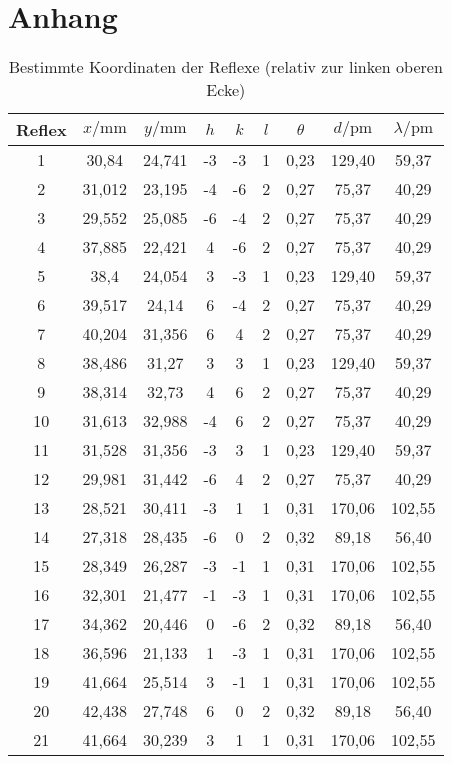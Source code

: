 \section{Anhang}
\begin{table}[h]
\centering
\caption{Bestimmte Koordinaten der Reflexe (relativ zur linken oberen Ecke)}
\label{tab:coords}
\begin{tabular}{ccccccccc}
\toprule
Reflex & $x/\si{\milli\meter}$ & $y/\si{\milli\meter}$ & $h$ & $k$ & $l$ & $\theta$ & $d/\si{\pico\meter}$ & $\lambda/\si{\pico\meter}$\\
\midrule
1 & 30,84 & 24,741 & -3 & -3 & 1 & 0,23 & 129,40 & 59,37\\
2 & 31,012 & 23,195 & -4 & -6 & 2 & 0,27 & 75,37 & 40,29\\
3 & 29,552 & 25,085 & -6 & -4 & 2 & 0,27 & 75,37 & 40,29\\
4 & 37,885 & 22,421 & 4 & -6 & 2 & 0,27 & 75,37 & 40,29\\
5 & 38,4 & 24,054 & 3 & -3 & 1 & 0,23 & 129,40 & 59,37\\
6 & 39,517 & 24,14 & 6 & -4 & 2 & 0,27 & 75,37 & 40,29\\
7 & 40,204 & 31,356 & 6 & 4 & 2 & 0,27 & 75,37 & 40,29\\
8 & 38,486 & 31,27 & 3 & 3 & 1 & 0,23 & 129,40 & 59,37\\
9 & 38,314 & 32,73 & 4 & 6 & 2 & 0,27 & 75,37 & 40,29\\
10 & 31,613 & 32,988 & -4 & 6 & 2 & 0,27 & 75,37 & 40,29\\
11 & 31,528 & 31,356 & -3 & 3 & 1 & 0,23 & 129,40 & 59,37\\
12 & 29,981 & 31,442 & -6 & 4 & 2 & 0,27 & 75,37 & 40,29\\
13 & 28,521 & 30,411 & -3 & 1 & 1 & 0,31 & 170,06 & 102,55\\
14 & 27,318 & 28,435 & -6 & 0 & 2 & 0,32 & 89,18 & 56,40\\
15 & 28,349 & 26,287 & -3 & -1 & 1 & 0,31 & 170,06 & 102,55\\
16 & 32,301 & 21,477 & -1 & -3 & 1 & 0,31 & 170,06 & 102,55\\
17 & 34,362 & 20,446 & 0 & -6 & 2 & 0,32 & 89,18 & 56,40\\
18 & 36,596 & 21,133 & 1 & -3 & 1 & 0,31 & 170,06 & 102,55\\
19 & 41,664 & 25,514 & 3 & -1 & 1 & 0,31 & 170,06 & 102,55\\
20 & 42,438 & 27,748 & 6 & 0 & 2 & 0,32 & 89,18 & 56,40\\
21 & 41,664 & 30,239 & 3 & 1 & 1 & 0,31 & 170,06 & 102,55\\

\end{tabular}
\end{table}
